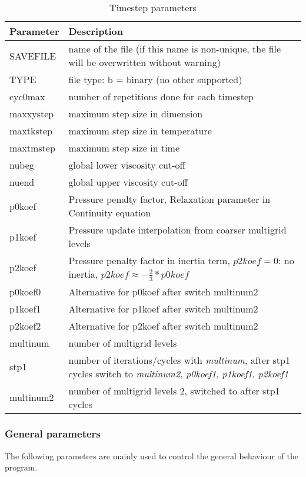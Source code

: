 \begin{table}[H]
\begin{table}[H]
\small
\centering
\begin{tabular}{l p{13cm}}
\toprule
Parameter & Description \\
\midrule
SAVEFILE & name of the file (if this name is non-unique, the file will be overwritten without warning) \\
TYPE & file type: b = binary (no other supported) \\
cyc0max & number of repetitions done for each timestep \\
maxxystep & maximum step size in dimension \\
maxtkstep & maximum step size in temperature \\
maxtmstep & maximum step size in time \\
nubeg & global lower viscosity cut-off \\
nuend & global upper viscosity cut-off \\
p0koef & Pressure penalty factor, Relaxation parameter in Continuity equation \\
p1koef & Pressure update interpolation from coarser multigrid levels \\
p2koef & Pressure penalty factor in inertia term, $p2koef=0$: no inertia, $p2koef\approx-\frac{2}{3}*p0koef$\\
p0koef0 & Alternative for p0koef after switch multinum2\\
p1koef1 & Alternative for p1koef after switch multinum2\\
p2koef2 & Alternative for p2koef after switch multinum2\\
multinum &  number of multigrid levels \\
stp1 & number of iterations/cycles with \textit{multinum}, after stp1 cycles switch to \textit{multinum2}, \textit{p0koef1}, \textit{p1koef1}, \textit{p2koef1}\\
multinum2 & number of multigrid levels 2, switched to after stp1 cycles\\
\bottomrule
\end{tabular}
\caption{Timestep parameters}
\label{tbl:timestep_parameters}
\end{table}

\subsubsection{General parameters}
The following parameters are mainly used to control the general behaviour of the program.


\end{table}
